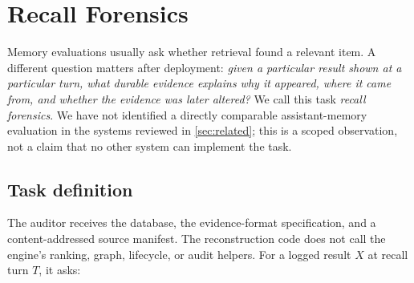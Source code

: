 \section{Recall Forensics}
\label{sec:forensics}

Memory evaluations usually ask whether retrieval found a relevant item. A
different question matters after deployment: \emph{given a particular result
shown at a particular turn, what durable evidence explains why it appeared,
where it came from, and whether the evidence was later altered?} We call this
task \emph{recall forensics}. We have not identified a directly comparable
assistant-memory evaluation in the systems reviewed in \cref{sec:related};
this is a scoped observation, not a claim that no other system can implement
the task.


\subsection{Task definition}
\label{sec:forensics-task}

The auditor receives the database, the evidence-format specification, and a
content-addressed source manifest. The reconstruction code does not call the
engine's ranking, graph, lifecycle, or audit helpers. For a logged result $X$
at recall turn $T$, it asks:

